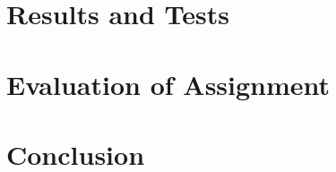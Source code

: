 \documentclass{article}
\begin{document}
\section*{Results and Tests}

\section*{Evaluation of Assignment}
\paragraph{}
\section*{Conclusion}
\paragraph{}

\begin{thebibliography}{9}
\end{thebibliography}
\end{document}
